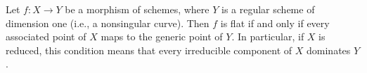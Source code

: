 Let $f: X \to Y$ be a morphism of schemes, where $Y$ is a regular scheme of dimension one (i.e., a nonsingular curve). Then $f$ is flat if and only if every associated point of $X$ maps to the generic point of $Y$. In particular, if $X$ is reduced, this condition means that every irreducible component of $X$ dominates $Y$.
